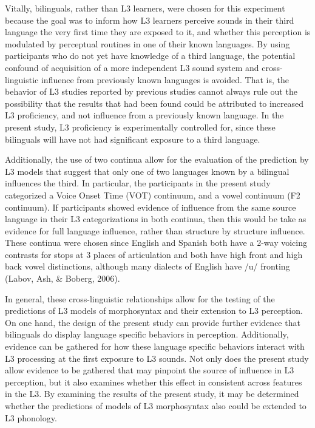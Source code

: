 \documentclass[
  english,
  man]{apa6}
\begin{document}
Vitally, bilinguals, rather than L3 learners, were chosen for this experiment because the goal was to inform how L3 learners perceive sounds in their third language the very first time they are exposed to it, and whether this perception is modulated by perceptual routines in one of their known languages.
By using participants who do not yet have knowledge of a third language, the potential confound of acquisition of a more independent L3 sound system and cross-linguistic influence from previously known languages is avoided.
That is, the behavior of L3 studies reported by previous studies cannot always rule out the possibility that the results that had been found could be attributed to increased L3 proficiency, and not influence from a previously known language.
In the present study, L3 proficiency is experimentally controlled for, since these bilinguals will have not had significant exposure to a third language.

Additionally, the use of two continua allow for the evaluation of the prediction by L3 models that suggest that only one of two languages known by a bilingual influences the third. In particular, the participants in the present study categorized a Voice Onset Time (VOT) continuum, and a vowel continuum (F2 continuum). If participants showed evidence of influence from the same source language in their L3 categorizations in both continua, then this would be take as evidence for full language influence, rather than structure by structure influence. These continua were chosen since English and Spanish both have a 2-way voicing contrasts for stops at 3 places of articulation and both have high front and high back vowel distinctions, although many dialects of English have /u/ fronting
(Labov, Ash, \& Boberg, 2006).

In general, these cross-linguistic relationships allow for the testing of the predictions of L3 models of morphosyntax and their extension to L3 perception. On one hand, the design of the present study can provide further evidence that bilinguals do display language specific behaviors in perception. Additionally, evidence can be gathered for how these language specific behaviors interact with L3 processing at the first exposure to L3 sounds.
Not only does the present study allow evidence to be gathered that may pinpoint the source of influence in L3 perception, but it also examines whether this effect in consistent across features in the L3.
By examining the results of the present study, it may be determined whether the predictions of models of L3 morphosyntax also could be extended to L3 phonology.
\end{document}

